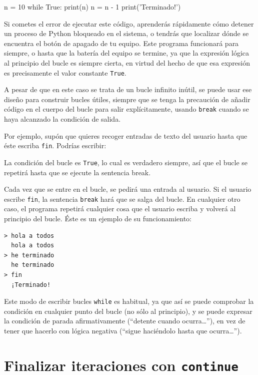 \begin{python}[frame=single]
n = 10
while True:
    print(n)
    n = n - 1
print('Terminado!')
\end{python}

Si cometes el error de ejecutar este código, aprenderás rápidamente cómo
detener un proceso de Python bloqueado en el sistema, o tendrás que
localizar dónde se encuentra el botón de apagado de tu equipo. Este
programa funcionará para siempre, o hasta que la batería del equipo se
termine, ya que la expresión lógica al principio del bucle es siempre
cierta, en virtud del hecho de que esa expresión es precisamente el
valor constante \texttt{True}.

A pesar de que en este caso se trata de un bucle infinito inútil, se
puede usar ese diseño para construir bucles útiles, siempre que se tenga
la precaución de añadir código en el cuerpo del bucle para salir
explícitamente, usando \texttt{break} cuando se haya alcanzado la
condición de salida.

Por ejemplo, supón que quieres recoger entradas de texto del usuario
hasta que éste escriba \texttt{fin}. Podrías escribir:


La condición del bucle es \texttt{True}, lo cual es verdadero siempre,
así que el bucle se repetirá hasta que se ejecute la sentencia break.

Cada vez que se entre en el bucle, se pedirá una entrada al usuario. Si
el usuario escribe \texttt{fin}, la sentencia \texttt{break} hará que se
salga del bucle. En cualquier otro caso, el programa repetirá cualquier
cosa que el usuario escriba y volverá al principio del bucle. Éste es un
ejemplo de su funcionamiento:

\begin{Verbatim}[frame=single]
> hola a todos
  hola a todos
> he terminado
  he terminado
> fin
  ¡Terminado!
\end{Verbatim}

Este modo de escribir bucles \texttt{while} es habitual, ya que así se
puede comprobar la condición en cualquier punto del bucle (no sólo al
principio), y se puede expresar la condición de parada afirmativamente
(``detente cuando ocurra\ldots{}''), en vez de tener que hacerlo con
lógica negativa (``sigue haciéndolo hasta que ocurra\ldots{}'').

\hypertarget{finalizar-iteraciones-con-continue}{%
\section{\texorpdfstring{Finalizar iteraciones con
\texttt{continue}}{Finalizar iteraciones con continue}}\label{finalizar-iteraciones-con-continue}}

